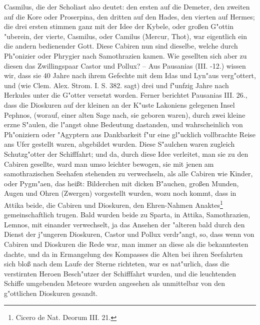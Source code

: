 \documentclass[a4paper, 11pt, oneside, polutonikogreek, german]{article}
\begin{document}
Casmilus, die der Scholiast also deutet: den ersten auf die Demeter, den zweiten auf die Kore oder Proserpina, den dritten auf den Hades, den vierten auf Hermes; die drei ersten stimmen ganz mit der Idee der Kybele, oder großen G"ottin "uberein, der vierte, Casmilus, oder Camilus (Mercur, Thot), war eigentlich ein die andern bedienender Gott. Diese Cabiren nun sind dieselbe, welche durch Ph"onizier oder Phrygier nach Samothrazien kamen. Wie gesellten sich aber zu diesen das Zwillingspaar Castor und Pollux? -- Aus Pausanias (III. -12.) wissen wir, dass sie 40 Jahre nach ihrem Gefechte mit dem Idas und Lyn"aus verg"ottert, und (wie Clem. Alex. Strom. I. S. 382. sagt) drei und f"unfzig Jahre nach Herkules unter die G"otter versetzt worden. Ferner berichtet Pausanias III. 26., dass die Dioskuren auf der kleinen an der K"uste Lakoniens gelegenen Insel Pephnos, (worauf, einer alten Sage nach, sie geboren waren), durch zwei kleine erzne S"aulen, die l"angst ohne Bedeutung dastanden, und wahrscheinlich von Ph"oniziern oder "Agyptern aus Dankbarkeit f"ur eine gl"ucklich vollbrachte Reise ans Ufer gestellt waren, abgebildet wurden. Diese S"aulchen waren zugleich Schutzg"otter der Schifffahrt; und da, durch diese Idee verleitet, man sie zu den Cabiren gesellte, ward man umso leichter bewogen, sie mit jenen am samothrazischen Seehafen stehenden zu verwechseln, als alle Cabiren wie Kinder, oder Pygm"aen, das heißt: Bilderchen mit dicken B"auchen, großen Munden, Augen und Ohren (Zwergen) vorgestellt wurden, wozu noch kommt, dass in Attika beide, die Cabiren und Dioskuren, den Ehren-Nahmen Anaktes\footnote{Cicero de Nat. Deorum III. 21.} gemeinschaftlich trugen. Bald wurden beide zu Sparta, in Attika, Samothrazien, Lemnos, mit einander verwechselt, ja das Ansehen der "alteren bald durch den Dienst der j"ungeren Dioskuren, Castor und Pollux verdr"angt, so, dass wenn von Cabiren und Dioskuren die Rede war, man immer an diese als die bekanntesten dachte, und da in Ermangelung des Kompasses die Alten bei ihren Seefahrten sich bloß nach dem Laufe der Sterne richteten, war es nat"urlich, dass die verstirnten Heroen Besch"utzer der Schifffahrt wurden, und die leuchtenden Schiffe umgebenden Meteore wurden angesehen als unmittelbar von den g"ottlichen Dioskuren gesandt.
\end{document}
